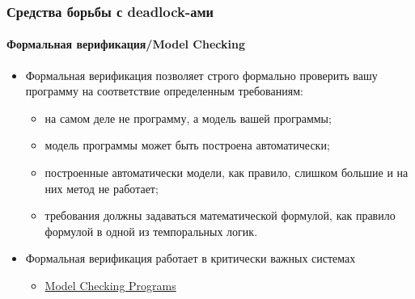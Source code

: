 \begin{frame}
\frametitle{Средства борьбы с deadlock-ами}
\framesubtitle{Формальная верификация/Model Checking}
\begin{itemize}
  \item Формальная верификация позволяет строго формально проверить вашу
  программу на соответствие определенным требованиям:
  \begin{itemize}
    \item на самом деле не программу, а модель вашей программы;
    \item модель программы может быть построена автоматически;
    \item построенные автоматически модели, как правило, слишком большие и на
    них метод не работает;
    \item требования должны задаваться математической формулой, как правило
    формулой в одной из темпоральных логик.
  \end{itemize}
  \item Формальная верификация работает в критически важных системах
  \begin{itemize}
    \item \href{https://ti.arc.nasa.gov/m/tech/rse/publications/papers/ASE00/jpf2-ase.pdf}{Model Checking Programs}
  \end{itemize}
\end{itemize}
\end{frame}

